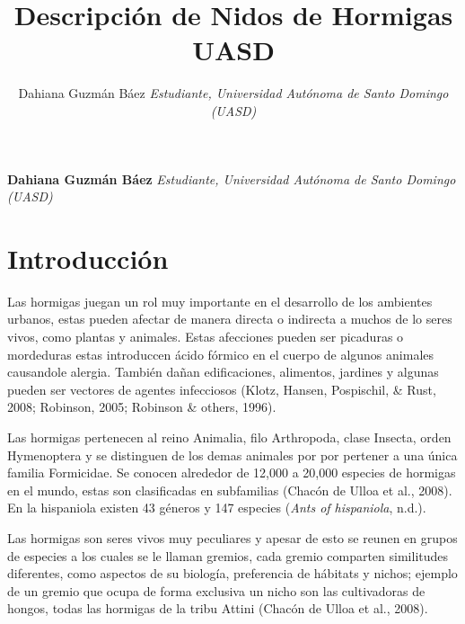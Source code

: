 \documentclass[11pt,]{article}
\title{Descripción de Nidos de Hormigas UASD  }
\author{\Large Dahiana Guzmán Báez\vspace{0.05in} \newline\normalsize\emph{Estudiante, Universidad Autónoma de Santo Domingo (UASD)}  }
\date{}
\newcommand*{\authorfont}{\fontfamily{phv}\selectfont}
\begin{document}
	
%

{%
\setlength{\parindent}{0pt}
\thispagestyle{plain}
{\fontsize{18}{20}\selectfont\raggedright 
\maketitle  %

}

{
   \vskip 13.5pt\relax \normalsize\fontsize{11}{12} 
\textbf{\authorfont Dahiana Guzmán Báez} \hskip 15pt \emph{\small Estudiante, Universidad Autónoma de Santo Domingo (UASD)}   

}

}






\vskip 6.5pt


\noindent  \section{Introducción}\label{introducciuxf3n}

Las hormigas juegan un rol muy importante en el desarrollo de los
ambientes urbanos, estas pueden afectar de manera directa o indirecta a
muchos de lo seres vivos, como plantas y animales. Estas afecciones
pueden ser picaduras o mordeduras estas introduccen ácido fórmico en el
cuerpo de algunos animales causandole alergia. También dañan
edificaciones, alimentos, jardines y algunas pueden ser vectores de
agentes infecciosos (Klotz, Hansen, Pospischil, \& Rust, 2008; Robinson,
2005; Robinson \& others, 1996).

Las hormigas pertenecen al reino Animalia, filo Arthropoda, clase
Insecta, orden Hymenoptera y se distinguen de los demas animales por por
pertener a una única familia Formicidae. Se conocen alrededor de 12,000
a 20,000 especies de hormigas en el mundo, estas son clasificadas en
subfamilias (Chacón de Ulloa et al., 2008). En la hispaniola existen 43
géneros y 147 especies (\emph{Ants of hispaniola}, n.d.).

Las hormigas son seres vivos muy peculiares y apesar de esto se reunen
en grupos de especies a los cuales se le llaman gremios, cada gremio
comparten similitudes diferentes, como aspectos de su biología,
preferencia de hábitats y nichos; ejemplo de un gremio que ocupa de
forma exclusiva un nicho son las cultivadoras de hongos, todas las
hormigas de la tribu Attini (Chacón de Ulloa et al., 2008).
\end{document}
